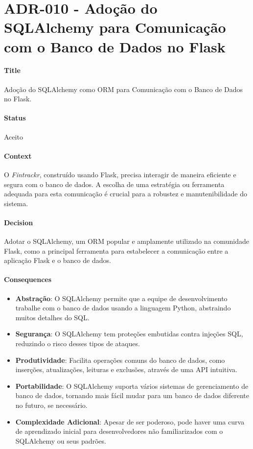 \chapter{ADR-010 - Adoção do SQLAlchemy para Comunicação com o Banco de Dados no Flask}
\label{apendiceADR010}

\subsubsection*{Title}
Adoção do SQLAlchemy como ORM para Comunicação com o Banco de Dados no Flask.

\subsubsection*{Status}
Aceito

\subsubsection*{Context}
O \textit{Fintrackr}, construído usando Flask, precisa interagir de maneira eficiente e segura com o banco de dados. A escolha de uma estratégia ou ferramenta adequada para esta comunicação é crucial para a robustez e manutenibilidade do sistema.

\subsubsection*{Decision}
Adotar o SQLAlchemy, um ORM popular e amplamente utilizado na comunidade Flask, como a principal ferramenta para estabelecer a comunicação entre a aplicação Flask e o banco de dados.

\subsubsection*{Consequences}
\begin{itemize}
	\item \textbf{Abstração}: O SQLAlchemy permite que a equipe de desenvolvimento trabalhe com o banco de dados usando a linguagem Python, abstraindo muitos detalhes do SQL.
	\item \textbf{Segurança}: O SQLAlchemy tem proteções embutidas contra injeções SQL, reduzindo o risco desses tipos de ataques.
	\item \textbf{Produtividade}: Facilita operações comuns do banco de dados, como inserções, atualizações, leituras e exclusões, através de uma API intuitiva.
	\item \textbf{Portabilidade}: O SQLAlchemy suporta vários sistemas de gerenciamento de banco de dados, tornando mais fácil mudar para um banco de dados diferente no futuro, se necessário.
	\item \textbf{Complexidade Adicional}: Apesar de ser poderoso, pode haver uma curva de aprendizado inicial para desenvolvedores não familiarizados com o SQLAlchemy ou seus padrões.
\end{itemize}

\newpage
